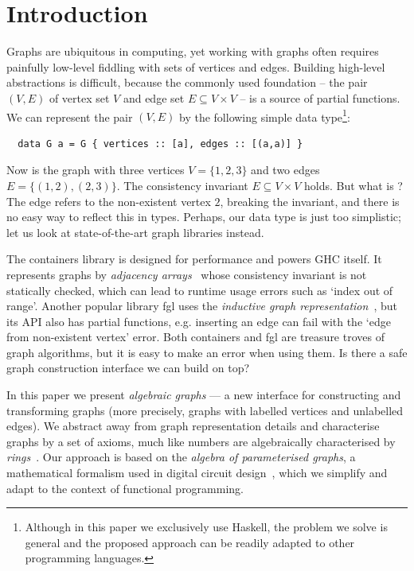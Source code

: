 \vspace{-2mm}
\section{Introduction}\label{sec-intro}
\vspace{-0.5mm}

Graphs are ubiquitous in computing, yet working with graphs often requires
painfully low-level fiddling with sets of vertices and edges. Building high-level
abstractions is difficult, because the commonly used foundation -- the pair $(V, E)$
of vertex set $V$ and edge set $E \subseteq V \times V$ -- is a source of partial
functions. We can represent the pair $(V, E)$ by the following simple data
type\footnote{Although in this paper we exclusively use Haskell, the problem we solve is
general and the proposed approach can be readily adapted to other programming languages.}:

\vspace{0.5mm}
\begin{verbatim}
  data G a = G { vertices :: [a], edges :: [(a,a)] }
\end{verbatim}
\vspace{0.5mm}

\noindent
Now  is the graph with three vertices $V = \{1,2,3\}$ and
two edges $E = \{(1,2), (2,3)\}$. The consistency invariant $E \subseteq V \times V$ holds.
But what is ? The edge refers to the non-existent vertex $2$, breaking the
invariant, and there is no easy way to reflect this in types. Perhaps, our data type is just
too simplistic; let us look at state-of-the-art graph libraries instead.

The \textsf{containers} library is designed for performance and powers GHC itself.
It represents graphs by \emph{adjacency arrays}~\cite{1995_king_graphs} whose
consistency invariant is not statically checked, which can lead to runtime
usage errors such as \textsf{`index out of range'}. Another popular library \textsf{fgl} uses
the \emph{inductive graph representation}~\cite{2001_erwig_inductive}, but its API also
has partial functions, e.g. inserting an edge can fail with the \textsf{`edge from
non-existent vertex'} error.
Both \textsf{containers} and \textsf{fgl} are treasure troves of graph algorithms,
but it is easy to make an error when using them. Is there a safe graph construction
interface we can build on top?

In this paper we present \emph{algebraic graphs} --- a new interface for constructing
and transforming graphs (more precisely, graphs with labelled vertices and unlabelled
edges). We abstract away from graph representation details and characterise graphs by a
set of axioms, much like numbers are algebraically characterised by
\emph{rings}~\cite{1999_maclane_algebra}. Our approach is based on the
\emph{algebra of parameterised graphs}, a mathematical formalism used in digital
circuit design~\cite{2014_algebra_mokhov}, which we simplify and adapt to the
context of functional programming.

